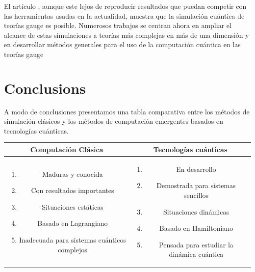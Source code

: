 \documentclass[a4paper,10pt]{article}
\begin{document}
\begin{multicols}{2}
El artículo \cite{martinez_real-time_2016}, aunque este lejos de reproducir resultados que puedan competir con las herramientas usadas en la actualidad, muestra que la simulación cuántica de teorías gauge es posible. Numerosos trabajos se centran ahora en ampliar el alcance de estas simulaciones a teorías más complejas en más de una dimensión \cite{davoudi_towards_2020,paulson_towards_2021} y en desarrollar métodos generales para el uso de la computación cuántica en las teorías gauge \cite{banuls_simulating_2020,kan_lattice_2022}

\section{Conclusions}
A modo de conclusiones presentamos una tabla comparativa entre los métodos de simulación clásicos y los métodos de computación emergentes basados en tecnologías cuánticas.

\begin{tabular}{c|c}
Computación Clásica & Tecnologías cuánticas \\
\hline
\begin{minipage}{0.2\textwidth}
\begin{enumerate}
\item Maduras y conocida
\item Con resultados importantes
\item Situaciones estáticas
\item Basado en Lagrangiano
\item Inadecuada para sistemas cuánticos complejos
\end{enumerate}
\end{minipage}

&

\begin{minipage}{0.2\textwidth}
\begin{enumerate}
\item En desarrollo
\item Demostrada para sistemas sencillos
\item Situaciones dinámicas
\item Basado en Hamiltoniano
\item Pensada para estudiar la dinámica cuántica
\end{enumerate}
\end{minipage}

\end{tabular}



\end{multicols}
\end{document}
